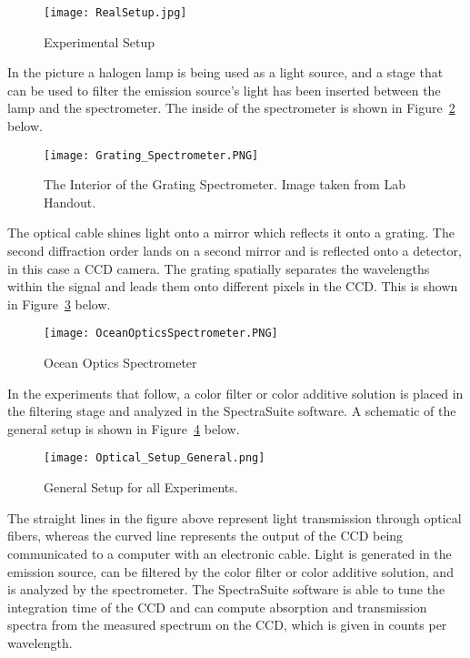 \documentclass{article}
\begin{document}
\begin{figure} [h!]
    \centering
    \texttt{[image: RealSetup.jpg]}
    \caption{Experimental Setup}
    \label{fig:real setup}
\end{figure}

In the picture a halogen lamp is being used as a light source, and a stage that can be used to filter the emission source's light has been inserted between the lamp and the spectrometer. The inside of the spectrometer is shown in Figure~\ref{fig:grating spectrometer} below. 

\begin{figure} [h!]
    \centering
    \texttt{[image: Grating\_Spectrometer.PNG]}
    \caption{The Interior of the Grating Spectrometer. Image taken from Lab Handout.}
    \label{fig:grating spectrometer}
\end{figure}

The optical cable  shines light onto a mirror which reflects it onto a grating. The second diffraction order lands on a second mirror and is reflected onto a detector, in this case a CCD camera. The grating spatially separates the wavelengths within the signal and leads them onto different pixels in the CCD. This is shown in Figure~\ref{fig:ocean optics spectrometer} below.

\begin{figure} [h!]
    \centering
    \texttt{[image: OceanOpticsSpectrometer.PNG]}
    \caption{Ocean Optics Spectrometer}
    \label{fig:ocean optics spectrometer}
\end{figure}

In the experiments that follow, a color filter or color additive solution is placed in the filtering stage and analyzed in the SpectraSuite software. A schematic of the general setup is shown in Figure~\ref{fig:optical setup schematic} below.

\begin{figure} [h!]
    \centering
    \texttt{[image: Optical\_Setup\_General.png]}
    \caption{General Setup for all Experiments.}
    \label{fig:optical setup schematic}
\end{figure}

The straight lines in the figure above represent light transmission through optical fibers, whereas the curved line represents the output of the CCD being communicated to a computer with an electronic cable. Light is generated in the emission source, can be filtered by the color filter or color additive solution, and is analyzed by the spectrometer. The SpectraSuite software is able to tune the integration time of the CCD and can compute absorption and transmission spectra from the measured spectrum on the CCD, which is given in counts per wavelength. 
\end{document}
